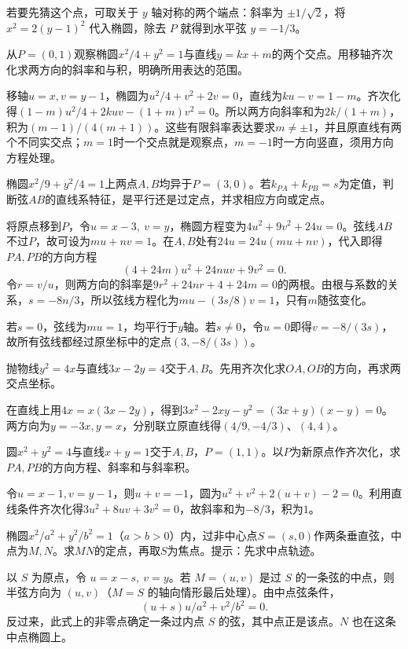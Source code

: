 若要先猜这个点，可取关于 \(y\) 轴对称的两个端点：斜率为 \(\pm1/\sqrt2\)，将 \(x^2=2(y-1)^2\) 代入椭圆，除去 \(P\) 就得到水平弦 \(y=-1/3\)。


从\(P=(0,1)\)观察椭圆\(x^2/4+y^2=1\)与直线\(y=kx+m\)的两个交点。用移轴齐次化求两方向的斜率和与积，明确所用表达的范围。
\par
\solutionanswer
移轴\(u=x,v=y-1\)，椭圆为\(u^2/4+v^2+2v=0\)，直线为\(ku-v=1-m\)。齐次化得\((1-m)u^2/4+2kuv-(1+m)v^2=0\)。所以两方向斜率和为\(2k/(1+m)\)，积为\((m-1)/(4(m+1))\)。这些有限斜率表达要求\(m\ne\pm1\)，并且原直线有两个不同实交点；\(m=1\)时一个交点就是观察点，\(m=-1\)时一方向竖直，须用方向方程处理。


椭圆\(x^2/9+y^2/4=1\)上两点\(A,B\)均异于\(P=(3,0)\)。若\(k_{PA}+k_{PB}=s\)为定值，判断弦\(AB\)的直线系特征，是平行还是过定点，并求相应方向或定点。
\par
\solutionanswer
将原点移到\(P\)，令\(u=x-3,\ v=y\)，椭圆方程变为\(4u^2+9v^2+24u=0\)。弦线\(AB\)不过\(P\)，故可设为\(mu+nv=1\)。在\(A,B\)处有\(24u=24u(mu+nv)\)，代入即得\(PA,PB\)的方向方程
\[
 (4+24m)u^2+24nuv+9v^2=0.
\]
令\(r=v/u\)，则两方向的斜率是\(9r^2+24nr+4+24m=0\)的两根。由根与系数的关系，\(s=-8n/3\)，所以弦线方程化为\(mu-(3s/8)v=1\)，只有\(m\)随弦变化。

若\(s=0\)，弦线为\(mu=1\)，均平行于\(y\)轴。若\(s\ne0\)，令\(u=0\)即得\(v=-8/(3s)\)，故所有弦线都经过原坐标中的定点\((3,-8/(3s))\)。


抛物线\(y^2=4x\)与直线\(3x-2y=4\)交于\(A,B\)。先用齐次化求\(OA,OB\)的方向，再求两交点坐标。
\par
\solutionanswer
在直线上用\(4x=x(3x-2y)\)，得到\(3x^2-2xy-y^2=(3x+y)(x-y)=0\)。两方向为\(y=-3x,y=x\)，分别联立原直线得\((4/9,-4/3)\)、\((4,4)\)。


圆\(x^2+y^2=4\)与直线\(x+y=1\)交于\(A,B\)，\(P=(1,1)\)。以\(P\)为新原点作齐次化，求\(PA,PB\)的方向方程、斜率和与斜率积。
\par
\solutionanswer
令\(u=x-1,v=y-1\)，则\(u+v=-1\)，圆为\(u^2+v^2+2(u+v)-2=0\)。利用直线条件齐次化得\(3u^2+8uv+3v^2=0\)，故斜率和为\(-8/3\)，积为\(1\)。


椭圆\(x^2/a^2+y^2/b^2=1\)（\(a>b>0\)）内，过非中心点\(S=(s,0)\)作两条垂直弦，中点为\(M,N\)。求\(MN\)的定点，再取\(S\)为焦点。提示：先求中点轨迹。
\par
\solutionanswer
以 \(S\) 为原点，令 \(u=x-s,\ v=y\)。若 \(M=(u,v)\) 是过 \(S\) 的一条弦的中点，则半弦方向为 \((u,v)\)（\(M=S\) 的轴向情形最后处理）。由中点弦条件，
\[
    (u+s)u/a^2+v^2/b^2=0 .
\]
反过来，此式上的非零点确定一条过内点 \(S\) 的弦，其中点正是该点。\(N\) 也在这条中点椭圆上。

